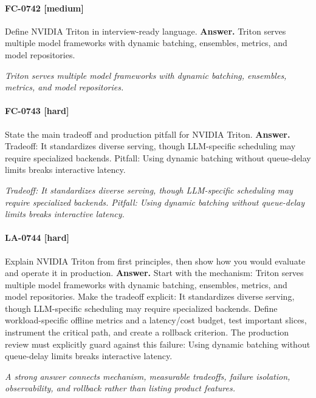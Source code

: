 \paragraph{FC-0742 [medium]} Define NVIDIA Triton in interview-ready language.
\noindent\textbf{Answer.} Triton serves multiple model frameworks with dynamic batching, ensembles, metrics, and model repositories.
\par\textit{Triton serves multiple model frameworks with dynamic batching, ensembles, metrics, and model repositories.}
\paragraph{FC-0743 [hard]} State the main tradeoff and production pitfall for NVIDIA Triton.
\noindent\textbf{Answer.} Tradeoff: It standardizes diverse serving, though LLM-specific scheduling may require specialized backends. Pitfall: Using dynamic batching without queue-delay limits breaks interactive latency.
\par\textit{Tradeoff: It standardizes diverse serving, though LLM-specific scheduling may require specialized backends. Pitfall: Using dynamic batching without queue-delay limits breaks interactive latency.}
\paragraph{LA-0744 [hard]} Explain NVIDIA Triton from first principles, then show how you would evaluate and operate it in production.
\noindent\textbf{Answer.} Start with the mechanism: Triton serves multiple model frameworks with dynamic batching, ensembles, metrics, and model repositories. Make the tradeoff explicit: It standardizes diverse serving, though LLM-specific scheduling may require specialized backends. Define workload-specific offline metrics and a latency/cost budget, test important slices, instrument the critical path, and create a rollback criterion. The production review must explicitly guard against this failure: Using dynamic batching without queue-delay limits breaks interactive latency.
\par\textit{A strong answer connects mechanism, measurable tradeoffs, failure isolation, observability, and rollback rather than listing product features.}

